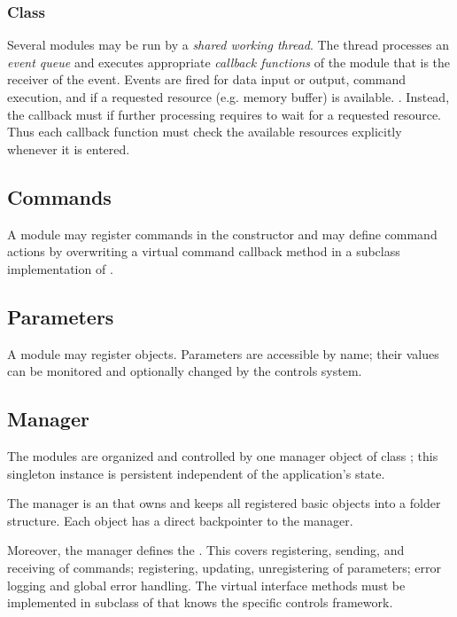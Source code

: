 \subsubsection{Class }
 Several modules may be run by a {\sl shared working thread}. 
      The thread processes an  {\sl event queue} and executes 
      appropriate  {\sl callback functions} 
      of the module that is the receiver of the event. Events are fired for data input 
      or output, command execution, and if a requested resource (e.g. memory buffer) 
      is available. . 
      Instead, the callback must  if further processing requires 
      to wait for a requested resource. Thus each callback function must check the 
      available resources explicitly whenever it is entered.     
\subsection{Commands}
A module may register commands in the constructor and may define 
   command actions by overwriting a virtual command callback method in a 
   subclass implementation of .
\subsection{Parameters}
A module may register  objects. Parameters are 
   accessible by name; their values can be monitored and optionally changed by 
   the controls system. 
\subsection{Manager}
The modules are organized and controlled by one manager object of class ;
this singleton instance is persistent independent of the application's state.

The manager is an  that owns and keeps all 
registered basic objects into a folder structure. Each object 
has a direct backpointer to the manager. 

Moreover, the manager defines the . 
This covers registering, sending, and receiving of commands; registering, 
updating, unregistering of parameters; error logging and global error handling. 
The virtual interface methods must be implemented in subclass of  that 
knows the specific controls framework.

